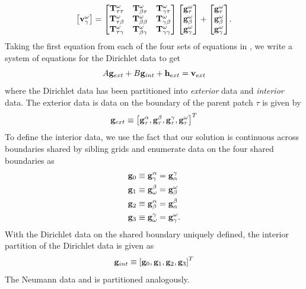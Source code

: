 \begin{equation}
\begin{aligned}
\begin{bmatrix}
        \mathbf v^{\omega}_{\gamma} \\
    \end{bmatrix}
    =
    \begin{bmatrix}
        \mathbf T^{\omega}_{\tau\tau}   & \mathbf T^{\omega}_{\beta\tau}   & \mathbf T^{\omega}_{\gamma\tau} \\
        \mathbf T^{\omega}_{\tau\beta}  & \mathbf T^{\omega}_{\beta\beta}  & \mathbf T^{\omega}_{\gamma\beta} \\
        \mathbf T^{\omega}_{\tau\gamma} & \mathbf T^{\omega}_{\beta\gamma} & \mathbf T^{\omega}_{\gamma\gamma} \\
    \end{bmatrix}
    \begin{bmatrix}
        \mathbf g^{\omega}_{\tau} \\
        \mathbf g^{\omega}_{\beta} \\
        \mathbf g^{\omega}_{\gamma} \\
    \end{bmatrix} +
    \begin{bmatrix}
        \mathbf g^{\omega}_{\tau} \\
        \mathbf g^{\omega}_{\beta} \\
        \mathbf g^{\omega}_{\gamma} \\
    \end{bmatrix} \\
\end{aligned}.
\label{eq:linalg_one}
\end{equation}
Taking the first equation from each of the four sets of equations in , we write a system of equations for the Dirichlet data to get
\begin{equation}
A\mathbf g_{ext} + B \mathbf g_{int} + \mathbf h_{ext} = \mathbf v_{ext}
\label{eq:sys_one}
\end{equation}
where the Dirichlet data has been partitioned into {\em exterior} data and {\em interior} data.  The exterior data is data on the boundary of the parent patch $\tau$ is given by
\begin{equation}
\mathbf g_{ext} \equiv \left[\mathbf g^{\alpha}_{\tau}, \mathbf g^{\beta}_{\tau} , \mathbf g^{\gamma}_{\tau}, \mathbf g^{\omega}_{\tau}\right]^T
\end{equation}
To define the interior data, we use the fact that our solution is continuous across boundaries shared by sibling grids and enumerate data on the four shared boundaries as
\begin{equation}
\begin{aligned}
\mathbf g_0 \equiv \mathbf g^{\alpha}_{\gamma} & = \mathbf g^{\gamma}_{\alpha}\\
\mathbf g_1 \equiv \mathbf g^{\beta}_{\omega} & = \mathbf g^{\omega}_{\beta}  \\
\mathbf g_2 \equiv \mathbf g^{\alpha}_{\beta} & = \mathbf g^{\beta}_{\alpha} \\
\mathbf g_3 \equiv \mathbf g^{\gamma}_{\omega} & = \mathbf g^{\omega}_{\gamma}.
\end{aligned}
\end{equation}
With the Dirichlet data on the shared boundary uniquely defined, the interior partition of the Dirichlet data is given as
\begin{equation}
\mathbf g_{int} \equiv \left[\mathbf g_0, \mathbf g_1, \mathbf g_2, \mathbf g_3\right]^T
\end{equation}
The Neumann data \vtau and \htau is partitioned analogously. 

